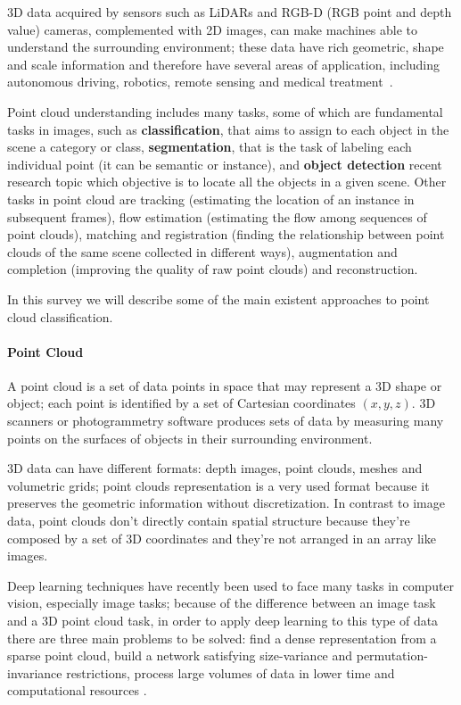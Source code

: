 3D data acquired by sensors such as LiDARs and RGB-D (RGB point and depth value) cameras, complemented with 2D images, can make machines able to understand the surrounding environment; these data have rich geometric, shape and scale information and therefore have several areas of application, including autonomous driving, robotics, remote sensing and medical treatment~\cite{guo2020deep}.

Point cloud understanding includes many tasks, some of which are fundamental tasks in images, such as \textbf{classification}, that aims to assign to each object in the scene a category or class, \textbf{segmentation}, that is the task of labeling each individual point (it can be semantic or instance), and \textbf{object detection} recent research topic which objective is to locate all the objects in a given scene. Other tasks in point cloud are tracking (estimating the location of an instance in subsequent frames), flow estimation (estimating the flow among sequences of point clouds), matching and registration (finding the relationship between point clouds of the same scene collected in different ways), augmentation and completion (improving the quality of raw point clouds) and reconstruction.

In this survey we will describe some of the main existent approaches to point cloud classification.

\paragraph{Point Cloud}

A point cloud is a set of data points in space that may represent a 3D shape or object; each point is identified by a set of Cartesian coordinates $(x,y,z)$. 3D scanners or photogrammetry software produces sets of data by measuring many points on the surfaces of objects in their surrounding environment.

3D data can have different formats: depth images, point clouds, meshes and volumetric grids; point clouds representation is a very used format because it preserves the geometric information without discretization. In contrast to image data, point clouds don't directly contain spatial structure because they're composed by a set of 3D coordinates and they're not arranged in an array like images.

Deep learning techniques have recently been used to face many tasks in computer vision, especially image tasks; because of the difference between an image task and a 3D point cloud task, in order to apply deep learning to this type of data there are three main problems to be solved: find a dense representation from a sparse point cloud, build a network satisfying size-variance and permutation-invariance restrictions, process large volumes of data in lower time and computational resources \cite{lu2020deep}.

